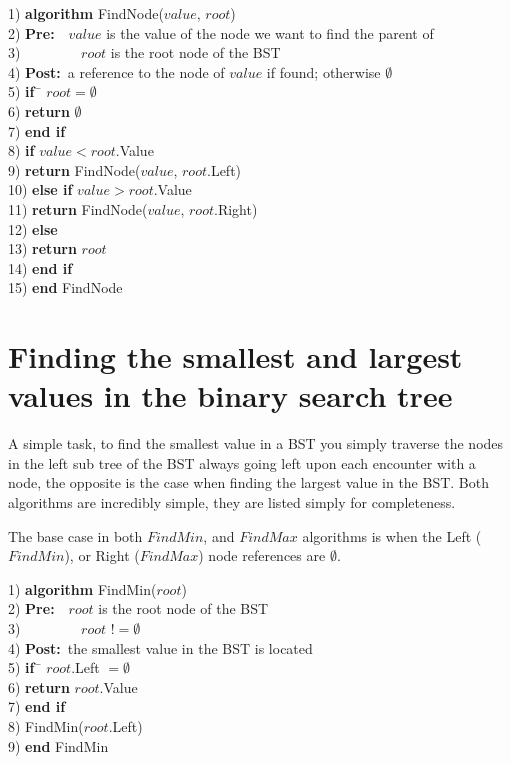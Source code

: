 \begin{tabbing}
1)  \textbf{alg}\= \textbf{orithm} FindNode($value$, $root$) \\
2)  \> \textbf{Pre:}~~$value$ is the value of the node we want to find the parent of \\
3)  \> ~~~~~~~~$root$ is the root node of the BST \\
4)  \> \textbf{Post:}~a reference to the node of $value$ if found; otherwise $\emptyset$ \\
5)  \> \textbf{if}~\= $root = \emptyset$ \\
6)  \> \> \textbf{return} $\emptyset$ \\
7)  \> \textbf{end if} \\
8)  \> \textbf{if} $value < root$.Value \\
9)  \> \> \textbf{return} FindNode($value$, $root$.Left) \\
10) \> \textbf{else if} $value > root$.Value \\
11) \> \> \textbf{return} FindNode($value$, $root$.Right) \\
12) \> \textbf{else} \\
13) \> \> \textbf{return} $root$ \\
14) \> \textbf{end if} \\
15) \textbf{end} FindNode \\
\end{tabbing}

\section{Finding the smallest and largest values in the binary search tree}
A simple task, to find the smallest value in a BST you simply traverse the nodes in the left sub tree of the BST always going left upon each encounter with a node, the opposite is the case when finding the largest value in the BST. Both algorithms are incredibly simple, they are listed simply for completeness.

The base case in both $FindMin$, and $FindMax$ algorithms is when the Left ($FindMin$), or Right ($FindMax$) node references are $\emptyset$.

\begin{tabbing}
1)  \textbf{alg}\= \textbf{orithm} FindMin($root$) \\
2)  \> \textbf{Pre:}~~$root$ is the root node of the BST \\
3)  \> ~~~~~~~~$root$ $!= \emptyset$ \\
4)  \> \textbf{Post:}~the smallest value in the BST is located \\
5)  \> \textbf{if}~\= $root$.Left $= \emptyset$ \\
6)  \> \> \textbf{return} $root$.Value \\
7)  \> \textbf{end if} \\
8)  \> FindMin($root$.Left) \\
9)  \textbf{end} FindMin \\
\end{tabbing}

